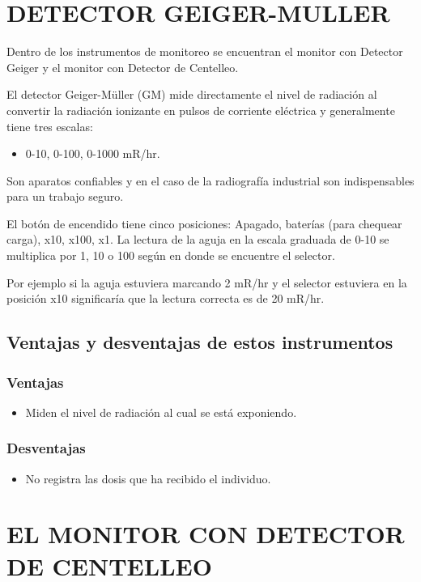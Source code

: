 \section*{DETECTOR GEIGER-MULLER}

Dentro de los instrumentos de monitoreo se encuentran el monitor con Detector Geiger y el monitor con Detector de Centelleo.

El detector Geiger-Müller (GM) mide directamente el nivel de radiación al convertir la radiación ionizante en pulsos de corriente eléctrica y generalmente tiene tres escalas:
\begin{itemize}
    \item 0-10, 0-100, 0-1000 mR/hr.
\end{itemize}

Son aparatos confiables y en el caso de la radiografía industrial son indispensables para un trabajo seguro.

El botón de encendido tiene cinco posiciones: Apagado, baterías (para chequear carga), x10, x100, x1. La lectura de la aguja en la escala graduada de 0-10 se multiplica por 1, 10 o 100 según en donde se encuentre el selector.

Por ejemplo si la aguja estuviera marcando 2 mR/hr y el selector estuviera en la posición x10 significaría que la lectura correcta es de 20 mR/hr.

\subsection*{Ventajas y desventajas de estos instrumentos}
\subsubsection*{Ventajas}
\begin{itemize}
    \item Miden el nivel de radiación al cual se está exponiendo.
\end{itemize}

\subsubsection*{Desventajas}
\begin{itemize}
    \item No registra las dosis que ha recibido el individuo.
\end{itemize}

\section*{EL MONITOR CON DETECTOR DE CENTELLEO}


